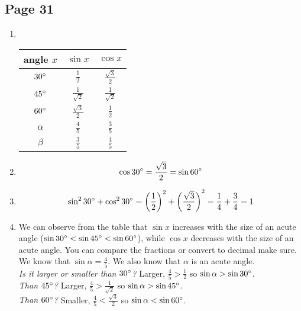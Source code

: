 \documentclass{article}
\newenvironment{solutions}[1]
{\subsection*{#1}
 \begin{enumerate}[leftmargin=1.5em]}
{\end{enumerate}}
\newcommand{\solution}{\item}
\begin{document}
\begin{solutions}{Page 31}
\solution ~ %
\begin{center}
\bgroup
\def\arraystretch{2}
\setlength\tabcolsep{15pt}
\begin{tabular}{ |c|c|c| }
\hline
angle $x$ & $\sin{x}$ & $\cos{x}$ \\
\hline
$30\degree$ & $\frac{1}{2}$        & $\frac{\sqrt{3}}{2}$ \\
$45\degree$ & $\frac{1}{\sqrt{2}}$ & $\frac{1}{\sqrt{2}}$ \\ 
$60\degree$ & $\frac{\sqrt{3}}{2}$ & $\frac{1}{2}$        \\
$\alpha$    & $\frac{4}{5}$        & $\frac{3}{5}$        \\
$\beta$     & $\frac{3}{5}$        & $\frac{4}{5}$        \\
\hline
\end{tabular}
\egroup
\end{center}

\solution %
\begin{equation*}
\cos{30\degree} = \frac{\sqrt{3}}{2} = \sin{60\degree}
\end{equation*}

\solution %
\begin{equation*}
\sin^{2}{30\degree} + \cos^{2}{30\degree} = \left(\frac{1}{2}\right)^{2} + \left(\frac{\sqrt{3}}{2}\right)^{2} = \frac{1}{4} + \frac{3}{4} = 1
\end{equation*}

\solution %
We can observe from the table that $\sin{x}$ increases with the size of an acute angle ($\sin{30\degree} < \sin{45\degree} < \sin{60\degree}$), while $\cos{x}$ decreases with the size of an acute angle. You can compare the fractions or convert to decimal make sure. We know that $\sin{\alpha} = \frac{4}{5}$. We also know that $\alpha$ is an acute angle.\\
\textit{Is it larger or smaller than $30\degree$?} Larger, $\frac{4}{5} > \frac{1}{2}$ so $\sin{\alpha} > \sin{30\degree}$.\\
\textit{Than $45\degree$?} Larger, $\frac{4}{5} > \frac{1}{\sqrt{2}}$ so $\sin{\alpha} > \sin{45\degree}$.\\
\textit{Than $60\degree$?} Smaller, $\frac{4}{5} < \frac{\sqrt{3}}{2}$ so $\sin{\alpha} < \sin{60\degree}$.

\end{solutions}
\end{document}
